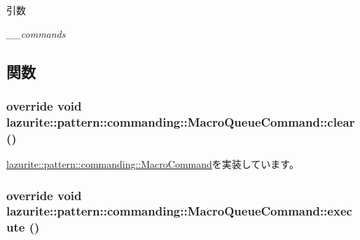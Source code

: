 \begin{DoxyParams}{引数}
\item[{\em \_\-\_\-commands}]\end{DoxyParams}


\subsection{関数}
\hypertarget{classlazurite_1_1pattern_1_1commanding_1_1_macro_queue_command_a1f76eeaa709e0610212aa983cd0aaf1d}{
\subsubsection[{clear}]{\setlength{\rightskip}{0pt plus 5cm}override void lazurite::pattern::commanding::MacroQueueCommand::clear ()}}
\label{classlazurite_1_1pattern_1_1commanding_1_1_macro_queue_command_a1f76eeaa709e0610212aa983cd0aaf1d}


\hyperlink{classlazurite_1_1pattern_1_1commanding_1_1_macro_command_a1ea80d83082f79545609f0c73bda0b7a}{lazurite::pattern::commanding::MacroCommand}を実装しています。\hypertarget{classlazurite_1_1pattern_1_1commanding_1_1_macro_queue_command_a64af4fe452bfe89416ff8a4459e96d69}{
\subsubsection[{execute}]{\setlength{\rightskip}{0pt plus 5cm}override void lazurite::pattern::commanding::MacroQueueCommand::execute ()}}
\label{classlazurite_1_1pattern_1_1commanding_1_1_macro_queue_command_a64af4fe452bfe89416ff8a4459e96d69}


